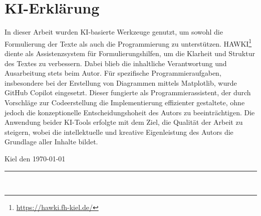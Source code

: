 \section*{KI-Erklärung}

In dieser Arbeit wurden KI-basierte Werkzeuge genutzt, um sowohl die Formulierung der Texte als auch die Programmierung zu unterstützen. HAWKI\footnote{\url{https://hawki.fh-kiel.de/}} diente als Assistenzsystem für Formulierungshilfen, um die Klarheit und Struktur des Textes zu verbessern. Dabei blieb die inhaltliche Verantwortung und Ausarbeitung stets beim Autor. Für spezifische Programmieraufgaben, insbesondere bei der Erstellung von Diagrammen mittels Matplotlib, wurde GitHub Copilot eingesetzt. Dieser fungierte als Programmierassistent, der durch Vorschläge zur Codeerstellung die Implementierung effizienter gestaltete, ohne jedoch die konzeptionelle Entscheidungshoheit des Autors zu beeinträchtigen. Die Anwendung beider KI-Tools erfolgte mit dem Ziel, die Qualität der Arbeit zu steigern, wobei die intellektuelle und kreative Eigenleistung des Autors die Grundlage aller Inhalte bildet.

Kiel den \today

\vspace{1cm} %

\rule{6cm}{1pt} %
\\ %
\me %